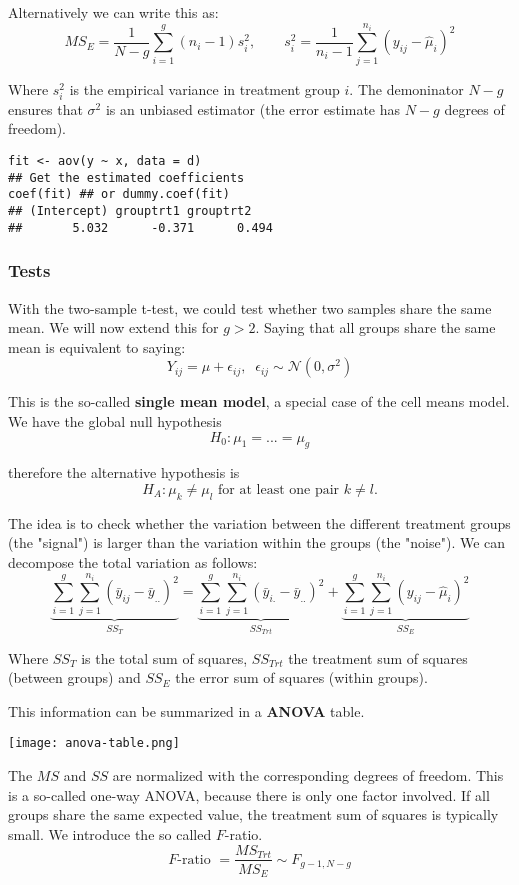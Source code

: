 Alternatively we can write this as:
$$MS_E = \frac{1}{N-g} \sum_{i=1}^g (n_i - 1) s_i^2, \qquad s_i^2 = \frac{1}{n_i -1} \sum_{j=1}^{n_i}(y_{ij} - \hat \mu_i)^2$$

Where $s_i^2$ is the empirical variance in treatment group $i$. The demoninator $N - g$ ensures that $\sigma^2$ is an unbiased estimator (the error estimate has $N-g$ degrees of freedom).

\begin{lstlisting}
fit <- aov(y ~ x, data = d)
## Get the estimated coefficients
coef(fit) ## or dummy.coef(fit)
## (Intercept) grouptrt1 grouptrt2
##       5.032      -0.371      0.494
\end{lstlisting}

\subsubsection{Tests}

With the two-sample t-test, we could test whether two samples share the same mean. We will now extend this for $g > 2$. Saying that all groups share the same mean is equivalent to saying:
$$Y_{ij} = \mu + \epsilon_{ij}, \; \; \epsilon_{ij} \sim \mathcal N(0, \sigma^2)$$

This is the so-called \textbf{single mean model}, a special case of the cell means model. We have the global null hypothesis
$$H_0 : \mu_1 = ... = \mu_g$$

therefore the alternative hypothesis is
$$H_A : \mu_k \neq \mu_l \text{ for at least one pair } k \neq l.$$

The idea is to check whether the variation between the different treatment groups (the "signal") is  larger than the variation within the groups (the "noise"). We can decompose the total variation as follows:
$$\underbrace{\sum_{i=1}^g \sum_{j=1}^{n_i}(\bar y_{ij} - \bar y_{..})^2}_{SS_T} = \underbrace{\sum_{i=1}^g \sum_{j=1}^{n_i}(\bar y_{i.} - \bar y_{..})^2}_{SS_{Trt}} + \underbrace{\sum_{i=1}^g \sum_{j=1}^{n_i}(y_{ij} - \hat \mu_i)^2}_{SS_E} $$

Where $SS_T$ is the total sum of squares, $SS_{Trt}$ the treatment sum of squares (between groups) and $SS_E$ the error sum of squares (within groups).\medskip

This information can be summarized in a \textbf{ANOVA} table.
\begin{center}
	\texttt{[image: anova-table.png]}
\end{center}

The $MS$ and $SS$ are normalized with the corresponding degrees of freedom. This is a so-called one-way ANOVA, because there is only one factor involved. If all groups share the same expected value, the treatment sum of squares is typically small. We introduce the so called $F$-ratio.
$$F\text{-ratio } = \frac{MS_{Trt}}{MS_E} \sim F_{g-1, N-g}$$

